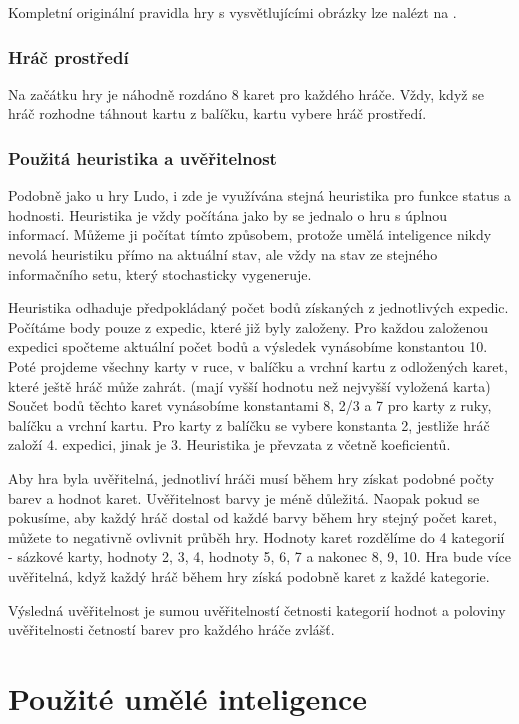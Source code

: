 Kompletní originální pravidla hry s vysvětlujícími obrázky lze nalézt na \cite{ztracmesta}.

\subsubsection{Hráč prostředí}

Na začátku hry je náhodně rozdáno 8 karet pro každého hráče. Vždy, když se hráč rozhodne táhnout kartu z balíčku, kartu vybere hráč prostředí.

\subsubsection{Použitá heuristika a uvěřitelnost}

Podobně jako u hry Ludo, i zde je využívána stejná heuristika pro funkce status a hodnosti. Heuristika je vždy počítána jako by se jednalo o hru s úplnou informací. Můžeme ji počítat tímto způsobem, protože umělá inteligence nikdy nevolá heuristiku přímo na aktuální stav, ale vždy na stav ze stejného informačního setu, který stochasticky vygeneruje.

Heuristika odhaduje předpokládaný počet bodů získaných z jednotlivých expedic. Počítáme body pouze z expedic, které již byly založeny. Pro každou založenou expedici spočteme aktuální počet bodů a výsledek vynásobíme konstantou 10. Poté projdeme všechny karty v ruce, v balíčku a vrchní kartu z odložených karet, které ještě hráč může zahrát. (mají vyšší hodnotu než nejvyšší vyložená karta) Součet bodů těchto karet vynásobíme konstantami 8, 2/3 a 7 pro karty z ruky, balíčku a vrchní kartu. Pro karty z balíčku se vybere konstanta 2, jestliže hráč založí 4. expedici, jinak je 3. Heuristika je převzata z \cite{ch5LT} včetně koeficientů.

Aby hra byla uvěřitelná, jednotliví hráči musí během hry získat podobné počty barev a hodnot karet. Uvěřitelnost barvy je méně důležitá. Naopak pokud se pokusíme, aby každý hráč dostal od každé barvy během hry stejný počet karet, můžete to negativně ovlivnit průběh hry. Hodnoty karet rozdělíme do 4 kategorií - sázkové karty, hodnoty 2, 3, 4, hodnoty 5, 6, 7 a nakonec 8, 9, 10. Hra bude více uvěřitelná, když každý hráč během hry získá podobně karet z každé kategorie.

Výsledná uvěřitelnost je sumou uvěřitelností četnosti kategorií hodnot a poloviny uvěřitelnosti četností barev pro každého hráče zvlášť.

\section{Použité umělé inteligence}

